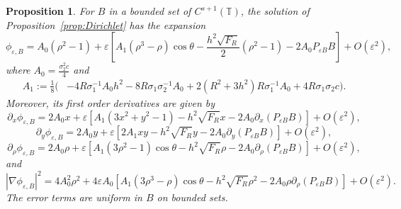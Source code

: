 \documentclass[12pt,reqno]{amsart}
\numberwithin{equation}{section}
\newtheorem{proposition}[theorem]{Proposition}
\theoremstyle{definition}
\theoremstyle{remark}
\begin{document}
 \begin{proposition}\label{prop:first-order-dirichlet-expansion}
 	For $B$ in a bounded set of $C^{s+1}(\mathbb{T})$, the solution of Proposition~\ref{prop:Dirichlet} has the expansion
\begin{equation}\label{eq:phi-expansion}
\phi_{\varepsilon,B}=A_0(\rho^2-1)+\varepsilon\left[A_1(\rho^3-\rho)\cos\theta-\frac{h^2\sqrt{F_R}}{2}(\rho^2-1)-2A_0P_{\varepsilon B}B\right]+O(\varepsilon^2),
\end{equation}
where  $A_0=\frac{\sigma_2^2c}{4}$ and
\begin{align*}\label{eq:A1}
A_1:=\frac18\Big(&-4R\sigma_1^{-1}A_0h^2
-8R\sigma_1\sigma_2^{-1}A_0
+2(R^2+3h^2)R\sigma_1^{-1}A_0 +4R \sigma_1\sigma_2c\Big).
\end{align*} 	
Moreover, its first order derivatives are given by  
\begin{equation}\label{eq:px}
\partial_x\phi_{\varepsilon,B}={} 2A_0x+\varepsilon \left[  A_1(3x^2+y^2-1)-  h^2\sqrt{F_R}x  
-2 A_0\partial_x(P_{\varepsilon B}B)\right] 
+O(\varepsilon^2),\tag{4.1a}
\end{equation}
\begin{equation}\label{eq:py}
\partial_y\phi_{\varepsilon,B}={} 2A_0y+\varepsilon \left [2A_1xy- h^2\sqrt{F_R}y  
-2 A_0\partial_y(P_{\varepsilon B}B)\right ]
+O(\varepsilon^2),\tag{4.1b}
\end{equation}
\begin{equation}\label{eq:prho}
\partial_{\rho}\phi_{\varepsilon,B}={} 2A_0\rho+\varepsilon \left[  A_1(3\rho^2-1)\cos\theta-  h^2\sqrt{F_R}\rho  
-2 A_0\partial_{\rho}(P_{\varepsilon B}B)\right] 
+O(\varepsilon^2),\tag{4.1c}
\end{equation}
and
\begin{equation}\label{eq:Dphi-square}
|\nabla\phi_{\varepsilon,B}|^2=4A_0^2\rho^2+4\varepsilon A_0 
\left[A_1(3\rho^3-\rho)\cos\theta-h^2\sqrt{F_R}\rho^2-2A_0\rho\partial_\rho(P_{\varepsilon B}B)\right]+O(\varepsilon^2).
\tag{4.1d}
\end{equation}
The error terms are uniform in $B$ on bounded sets.
 \end{proposition}
 
\end{document}

